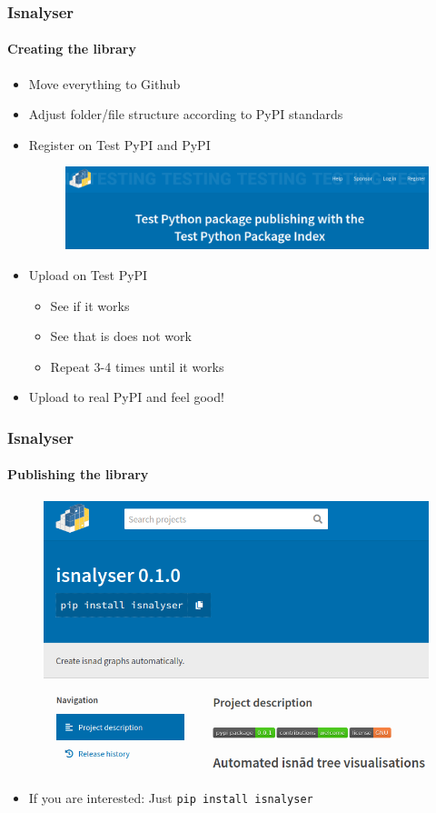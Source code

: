 \documentclass[9pt]{beamer}
\begin{document}
\begin{frame}
\frametitle{Isnalyser}
\framesubtitle{Creating the library}
\begin{itemize}%
	\item Move everything to Github
	\item Adjust folder/file structure according to PyPI standards
	\item Register on Test PyPI and PyPI
	\begin{figure}
		\flushleft
		\includegraphics[width=.5\linewidth]{figures/test_pypi.png}
	\end{figure}
	\item Upload on Test PyPI
	\begin{itemize}
		\item See if it works
		\item See that is does not work
		\item Repeat 3-4 times until it works
	\end{itemize}
	\item Upload to real PyPI and feel good!
\end{itemize}
\end{frame} 


\begin{frame}
\frametitle{Isnalyser}
\framesubtitle{Publishing the library}
	\begin{figure}
	\flushleft
	\includegraphics[width=.6\linewidth]{figures/pypi.png}
\end{figure}
\begin{itemize}%
	\item If you are interested: Just \texttt{pip install isnalyser}
\end{itemize}
\end{frame} 
\end{document}

